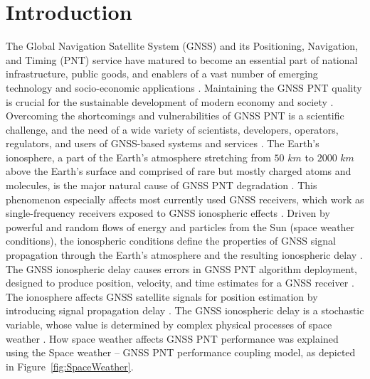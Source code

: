 \let\LaTeXcline\cline\documentclass[sn-mathphys-num]{sn-jnl}\let\cline\LaTeXcline
\begin{document}



\maketitle

\section{Introduction}

The Global Navigation Satellite System (GNSS) and its Positioning, Navigation, and Timing (PNT) service have matured to become an essential part of national infrastructure, public goods, and enablers of a vast number of emerging technology and socio-economic applications \cite{spilker1996global}. Maintaining the GNSS PNT quality is crucial for the sustainable development of modern economy and society \cite{schaer1999mapping}. Overcoming the shortcomings and vulnerabilities of GNSS PNT is a scientific challenge, and the need of a wide variety of scientists, developers, operators, regulators, and users of GNSS-based systems and services \cite{durmaz2015regional, jin2012m_dcb}. The Earth’s ionosphere, a part of the Earth’s atmosphere stretching from $50$ $km$ to $2000$ $km$ above the Earth’s surface and comprised of rare but mostly charged atoms and molecules, is the major natural cause of GNSS PNT degradation \cite{davies1990ionospheric, liu2009seismoionospheric}. This phenomenon especially affects most currently used GNSS receivers, which work as single-frequency receivers exposed to GNSS ionospheric effects \cite{spilker1996global, prolss2012physics}. Driven by powerful and random flows of energy and particles from the Sun (space weather conditions), the ionospheric conditions define the properties of GNSS signal propagation through the Earth’s atmosphere and the resulting ionospheric delay \cite{davies1990ionospheric, oxley2017uncertainties, prolss2012physics}. The GNSS ionospheric delay causes errors in GNSS PNT algorithm deployment, designed to produce position, velocity, and time estimates for a GNSS receiver \cite{spilker1996global, schaer1999mapping}. The ionosphere affects GNSS satellite signals for position estimation by introducing signal propagation delay \cite{spilker1996global, schaer1999mapping}. The GNSS ionospheric delay is a stochastic variable, whose value is determined by complex physical processes of space weather \cite{spilker1996global, schaer1999mapping}. How space weather affects GNSS PNT performance was explained using the Space weather – GNSS PNT performance coupling model, as depicted in Figure~\ref{fig:SpaceWeather}.
\end{document}

